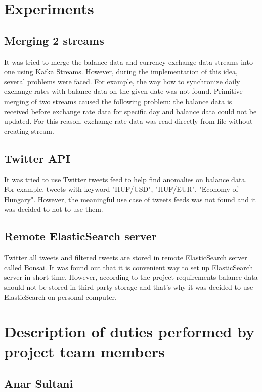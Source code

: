 \documentclass{article}
\begin{document}
\section{Experiments}

\subsection{Merging 2 streams}

It was tried to merge the balance data and currency exchange data streams into one using Kafka Streams. However, during the implementation of this idea, several problems were faced. For example, the way how to synchronize daily exchange rates with balance data on the given date was not found. Primitive merging of two streams caused the following problem: the balance data is received before exchange rate data for specific day and balance data could not be updated. For this reason, exchange rate data was read directly from file without creating stream.

\subsection{Twitter API}

It was tried to use Twitter tweets feed to help find anomalies on balance data. For example, tweets with keyword "HUF/USD", "HUF/EUR", "Economy of Hungary". However, the meaningful use case of tweets feeds was not found and it was decided to not to use them.

\subsection{Remote ElasticSearch server}

Twitter all tweets and filtered tweets are stored in remote ElasticSearch server called Bonsai. It was found out that it is convenient way to set up ElasticSearch server in short time. However, according to the project requirements balance data should not be stored in third party storage and that's why it was decided to use ElasticSearch on personal computer. 

\section{Description of duties performed by project team members}

\subsection{Anar Sultani}
\end{document}
